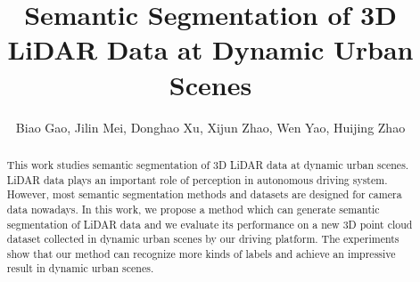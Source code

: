 






\title{Semantic Segmentation of 3D LiDAR Data at Dynamic Urban Scenes}




\author{\authorblockN
	{Biao Gao,
		Jilin Mei, 
		Donghao Xu,
		Xijun Zhao,
		Wen Yao,
		Huijing Zhao}
}



\maketitle

\begin{abstract}
This work studies semantic segmentation of 3D LiDAR data at dynamic urban scenes. LiDAR data plays an important role of perception in autonomous driving system. However, most semantic segmentation methods and datasets are designed for camera data nowadays. In this work, we propose a method which can generate semantic segmentation of LiDAR data and we evaluate its performance on a new 3D point cloud dataset collected in dynamic urban scenes by our driving platform. The experiments show that our method can recognize more kinds of labels and achieve an impressive result in dynamic urban scenes.
\end{abstract}


